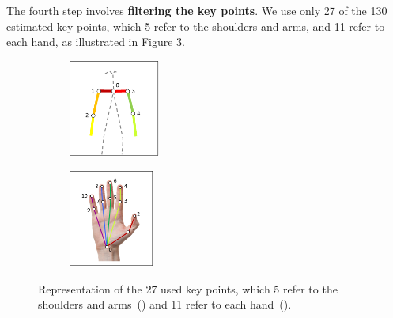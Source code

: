The fourth step involves \textbf{filtering the key points}. We use only 27 of the 130 estimated key points, which 5 refer to the shoulders and arms, and 11 refer to each hand, as illustrated in Figure \ref{fig:filtered-keypoints}. %



\begin{figure}
    \centering
    \begin{subfigure}{3.0cm}
        \centering
        \includegraphics[height=3.2cm]{images/filtered_keypoints_body}
        \caption{}
        \label{fig:filtered-keypoints-body}
    \end{subfigure}
    \begin{subfigure}{3.0cm}
      \centering
      \includegraphics[height=3.2cm]{images/filtered_keypoints_hand}
      \caption{}
      \label{fig:filtered-keypoints-hand}
    \end{subfigure}
    \caption{
        Representation of the 27 used key points, which 5 refer to the shoulders and arms~() and 11 refer to each hand~().
    }
    \label{fig:filtered-keypoints}
\end{figure}

